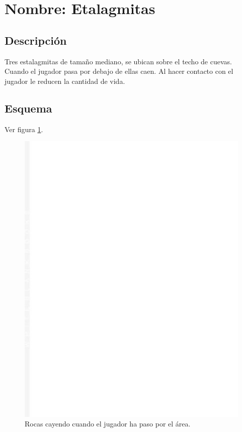 \section{Nombre: Etalagmitas}\label{obs.rocas}
	\subsection{Descripción}
	Tres estalagmitas de tamaño mediano, se ubican sobre el techo de cuevas. Cuando el jugador pasa por debajo de ellas caen. Al hacer contacto con el jugador le reducen la cantidad de vida.
	\subsection{Esquema}
	Ver figura \ref{fig:rocas}.
	\begin{figure}
		\centering
		\includegraphics[height=0.2 \textheight]{Imagenes/rocas}
		\caption{Rocas cayendo cuando el jugador ha paso por el área.}
		\label{fig:rocas}
	\end{figure}